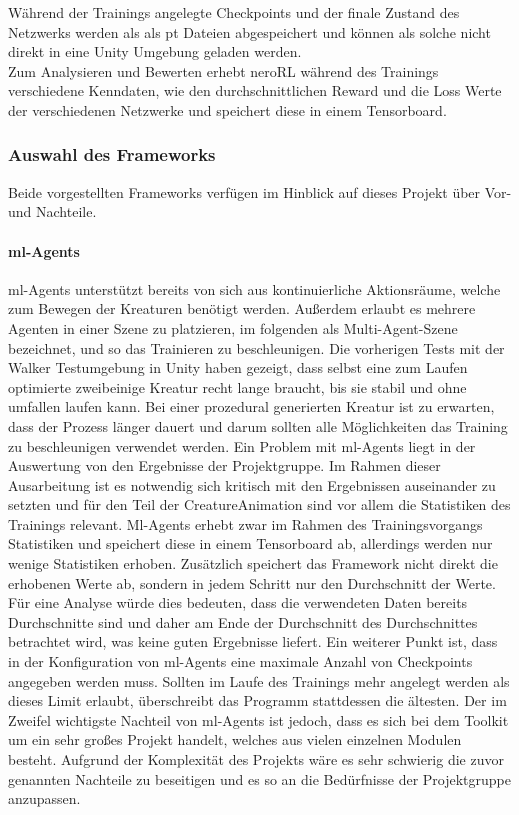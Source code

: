 \noindent Während der Trainings angelegte Checkpoints und der finale Zustand des Netzwerks werden als als pt Dateien abgespeichert und können als solche nicht direkt in eine Unity Umgebung geladen werden.\\
Zum Analysieren und Bewerten erhebt neroRL während des Trainings verschiedene Kenndaten, wie den durchschnittlichen Reward und die Loss Werte der verschiedenen Netzwerke und speichert diese in einem Tensorboard.

\subsubsection{Auswahl des Frameworks}

Beide vorgestellten Frameworks verfügen im Hinblick auf dieses Projekt über Vor- und Nachteile.

\paragraph{ml-Agents}\fup
ml-Agents unterstützt bereits von sich aus kontinuierliche Aktionsräume, welche zum Bewegen der Kreaturen benötigt werden. Außerdem erlaubt es mehrere Agenten in einer Szene zu platzieren, im folgenden als Multi-Agent-Szene bezeichnet, und so das Trainieren zu beschleunigen. 
Die vorherigen Tests mit der Walker Testumgebung in Unity \cite{walkerEnv} haben gezeigt, dass selbst eine zum Laufen optimierte zweibeinige Kreatur recht lange braucht, bis sie stabil und ohne umfallen laufen kann.
Bei einer prozedural generierten Kreatur ist zu erwarten, dass der Prozess länger dauert und darum sollten alle Möglichkeiten das Training zu beschleunigen verwendet werden.
Ein Problem mit ml-Agents liegt in der Auswertung von den Ergebnisse der Projektgruppe. Im Rahmen dieser Ausarbeitung ist es notwendig sich kritisch mit den Ergebnissen auseinander zu setzten und für den Teil der CreatureAnimation sind vor allem die Statistiken des Trainings relevant. Ml-Agents erhebt zwar im Rahmen des Trainingsvorgangs Statistiken und speichert diese in einem Tensorboard ab, allerdings werden nur wenige Statistiken erhoben. Zusätzlich speichert das Framework nicht direkt die erhobenen Werte ab, sondern in jedem Schritt nur den Durchschnitt der Werte. Für eine Analyse würde dies bedeuten, dass die verwendeten Daten bereits Durchschnitte sind und daher am Ende der Durchschnitt des Durchschnittes betrachtet wird, was keine guten Ergebnisse liefert. 
Ein weiterer Punkt ist, dass in der Konfiguration von ml-Agents eine maximale Anzahl von Checkpoints angegeben werden muss. Sollten im Laufe des Trainings mehr angelegt werden als dieses Limit erlaubt, überschreibt das Programm stattdessen die ältesten.
Der im Zweifel wichtigste Nachteil von ml-Agents ist jedoch, dass es sich bei dem Toolkit um ein sehr großes Projekt handelt, welches aus vielen einzelnen Modulen besteht. Aufgrund der Komplexität des Projekts wäre es sehr schwierig die zuvor genannten Nachteile zu beseitigen und es so an die Bedürfnisse der Projektgruppe anzupassen.\\
